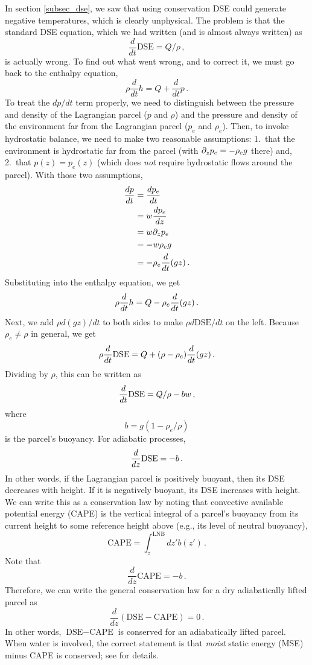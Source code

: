 \documentclass[12pt]{article}
\newcommand{\dse}{{\text{DSE}}}
\begin{document}
In section \ref{subsec_dse}, we saw that using conservation DSE could generate negative temperatures, which is clearly unphysical.  The problem is that the standard DSE equation, which we had written (and is almost always written) as
\[
\frac{d}{dt} \dse = Q/\rho \, ,
\]
is actually wrong.  To find out what went wrong, and to correct it, we must go back to the enthalpy equation,
\[
\rho \frac{d}{dt} h = Q + \frac{d}{dt} p \, .
\]
To treat the $dp/dt$ term properly, we need to distinguish between the pressure and density of the Lagrangian parcel ($p$ and $\rho$) and the pressure and density of the environment far from the Lagrangian parcel ($p_e$ and $\rho_e$).  Then, to invoke hydrostatic balance, we need to make two reasonable assumptions: 1.~that the environment is hydrostatic far from the parcel (with $\partial_z p_e = -\rho_e g$ there) and, 2.~that $p(z) = p_e(z)$ (which does {\it not} require hydrostatic flows around the parcel).  With those two assumptions,
\begin{align}
\frac{dp}{dt} &= \frac{dp_e}{dt} \\
&= w \frac{dp_e}{dz} \\
&= w \partial_z p_e \\
&= -w \rho_e g \\
&= -\rho_e {\frac{d}{dt}} (gz) \, .
\end{align}
Substituting into the enthalpy equation, we get
\[
\rho {\frac{d}{dt}} h = Q - \rho_e {\frac{d}{dt}} (gz) \, .
\]
Next, we add $\rho d(gz)/dt$ to both sides to make $\rho d\dse{}/dt$ on the left.  Because $\rho_e \neq \rho$ in general, we get
\[
\rho \ddt \dse{} = Q + (\rho - \rho_e) \ddt (gz) \, .
\]
Dividing by $\rho$, this can be written as
\begin{equation}
\ddt \dse{} = Q/\rho - b w \, , \label{dse_corrected}
\end{equation}
where
\begin{equation}
b = g (1 - \rho_e/\rho)
\end{equation}
is the parcel's buoyancy.  For adiabatic processes,
\[
\ddz \dse{} = -b \, .
\]
In other words, if the Lagrangian parcel is positively buoyant, then its DSE decreases with height.  If it is negatively buoyant, its DSE increases with height.  We can write this as a conservation law by noting that convective available potential energy (CAPE) is the vertical integral of a parcel's buoyancy from its current height to some reference height above (e.g., its level of neutral buoyancy),
\[
\text{CAPE} = \int_z^{\text{LNB}} dz' b(z') \, .
\]
Note that
\[
\frac{d}{dz} \text{CAPE} = -b \, .
\]
Therefore, we can write the general conservation law for a dry adiabatically lifted parcel as
\[
\frac{d}{dz} \left( \text{DSE} - \text{CAPE} \right) = 0 \, .
\]
In other words, $\dse{}-\text{CAPE}$ is conserved for an adiabatically lifted parcel.  When water is involved, the correct statement is that {\it moist} static energy (MSE) minus CAPE is conserved; see \citet{15mse} for details.
\end{document}
